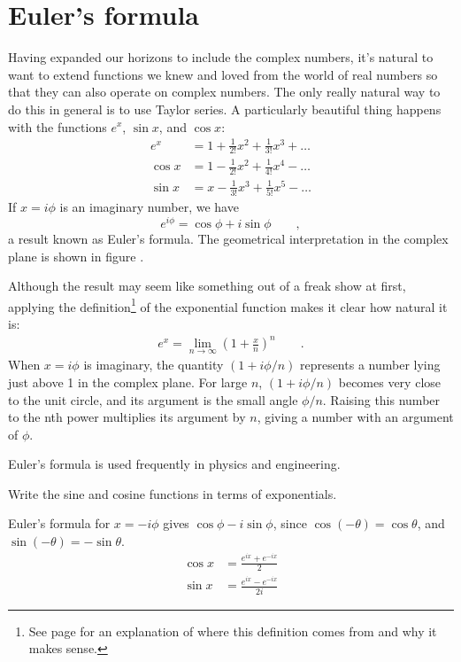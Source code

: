 \section{Euler's formula}

Having expanded our horizons to include the complex numbers, it's natural to want to extend
functions we knew and loved from the world of real numbers so that they can also operate on
complex numbers. The only really natural way to do this in general is to use Taylor series.
A particularly beautiful thing happens with the functions $e^x$, $\sin x$, and $\cos x$:
\begin{align*}
  e^x    &= 1 + \frac{1}{2!}x^2 + \frac{1}{3!}x^3 + \ldots \\
  \cos x &= 1 - \frac{1}{2!}x^2 + \frac{1}{4!}x^4 - \ldots \\
  \sin x &= x - \frac{1}{3!}x^3 + \frac{1}{5!}x^5 - \ldots 
\end{align*}
If $x=i\phi$ is an imaginary number, we have
\begin{equation*}
  e^{i\phi} = \cos \phi + i \sin \phi \qquad ,
\end{equation*}
a result known as Euler's formula.
The geometrical interpretation in the complex
plane is shown in figure .


Although the result may seem like something out of a freak show at first,
applying the definition\footnote{See page \pageref{definition-of-exp} for an explanation
of where this definition comes from and why it makes sense.} of the exponential function
makes it clear how natural it is:
\begin{align*}
  e^x = \lim_{n\rightarrow \infty} \left(1+\frac{x}{n}\right)^n \qquad .
\end{align*}
When $x=i\phi$ is imaginary, the quantity $(1+i\phi/n)$ represents a number
lying just above 1 in the complex plane. For large $n$, $(1+i\phi/n)$
becomes very close to the unit circle, and its argument is the small
angle $\phi/n$. Raising this number to the nth power multiplies its
argument by $n$, giving a number with an argument of $\phi$.


Euler's formula is used frequently in physics and engineering.

\pagebreak

\begin{eg}
\egquestion Write the sine and cosine functions in terms of exponentials.

\eganswer Euler's formula for $x=-i\phi$ gives $\cos \phi - i \sin \phi$,
since $\cos(-\theta)=\cos\theta$, and $\sin(-\theta)=-\sin\theta$.
\begin{align*}
  \cos x &= \frac{e^{ix}+e^{-ix}}{2} \\
  \sin x &= \frac{e^{ix}-e^{-ix}}{2i} 
\end{align*}
\end{eg}

